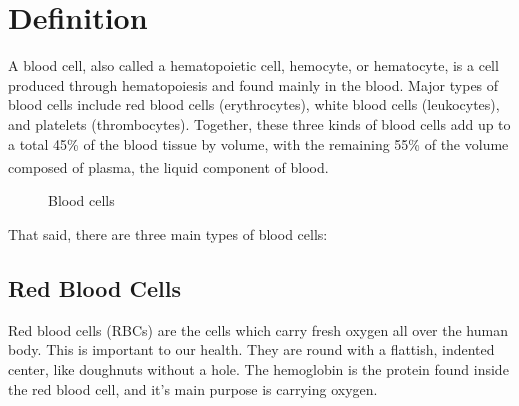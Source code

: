 \section{Definition}
\vspace{0.2in}
\hspace*{0.16in}

A blood cell, also called a hematopoietic cell, hemocyte, or hematocyte, is a cell produced through hematopoiesis and found mainly in the blood. Major types of blood cells include red blood cells (erythrocytes), white blood cells (leukocytes), and platelets (thrombocytes). Together, these three kinds of blood cells add up to a total 45\% of the blood tissue by volume, with the remaining 55\% of the volume composed of plasma, the liquid component of blood. \textsuperscript{\cite{hopkins1993human}}\\

\vspace{0.1in}

\begin{figure}[h]
\centering
  \vspace{-0.1in}
    \centerline{}
    \caption{Blood cells}
\end{figure}

That said, there are three main types of blood cells:

\subsection{Red Blood Cells}

Red blood cells (RBCs) are the cells which carry fresh oxygen all over the human body. This is important to our health. They are round with a flattish, indented center, like doughnuts without a hole. 
The hemoglobin is the protein found inside the red blood cell, and it's main purpose is carrying oxygen.

